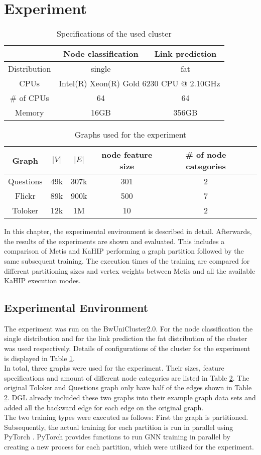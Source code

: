 \documentclass[acmsmall,nonacm,screen,review]{acmart}
\begin{document}
\section{Experiment}
\begin{table}[bt!]
\centering
\begin{tabular}{ ccc }
 \centering
  & Node classification & Link prediction \\ 
 \hline
 Distribution & single & fat \\
 CPUs & \multicolumn{2}{c}{Intel(R) Xeon(R) Gold 6230 CPU @ 2.10GHz} \\ 
 \# of CPUs & 64 & 64 \\ 
 Memory & 16GB & 356GB \\
\end{tabular}
\caption{Specifications of the used cluster}
\label{hw}
\end{table}
\begin{table}[bt!]
\centering
\begin{tabular}{ cccccc }
 \centering
 Graph & $|V|$ & $|E|$ & node feature size & \# of node categories \\ 
 \hline
 Questions \cite{TQ} & 49k & 307k & 301 & 2 \\ 
 Flickr \cite{Flickr} & 89k & 900k & 500 & 7\\ 
 Toloker \cite{TQ,Tolokers} & 12k & 1M & 10 & 2 \\

\end{tabular}
\caption{Graphs used for the experiment}
\label{graphs}
\end{table}
In this chapter, the experimental environment is described in detail. Afterwards, the results of the experiments are shown and evaluated. This includes a comparison of Metis and KaHIP performing a graph partition followed by the same subsequent training. The execution times of the training are compared for different partitioning sizes and vertex weights between Metis and all the available KaHIP execution modes. 
\subsection{Experimental Environment}
The experiment was run on the BwUniCluster2.0. For the node classification the single distribution and for the link prediction the fat distribution of the cluster was used respectively. Details of configurations of the cluster for the experiment is displayed in Table \ref{hw}.\\
In total, three graphs were used for the experiment. Their sizes, feature specifications and amount of different node categories are listed in Table \ref{graphs}. The original Toloker and Questions graph only have half of the edges shown in Table \ref{graphs}. DGL already included these two graphs into their example graph data sets and added all the backward edge for each edge on the original graph.\\
The two training types were executed as follows: First the graph is partitioned. Subsequently, the actual training for each partition is run in parallel using PyTorch \cite{PyTorch}. PyTorch provides functions to run GNN training in parallel by creating a new process for each partition, which were utilized for the experiment.
\end{document}

